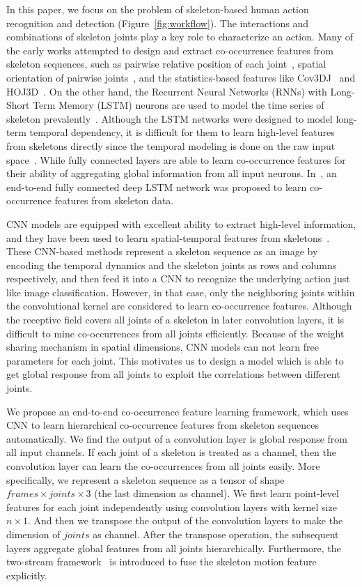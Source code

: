 \documentclass{article}
\begin{document}
In this paper, we focus on the problem of skeleton-based human action recognition and detection (Figure~\ref{fig:workflow}). The interactions and combinations of skeleton joints play a key role to characterize an action. Many of the early works attempted to design and extract co-occurrence features from skeleton sequences, such as pairwise relative position of each joint~\cite{Wang2014Learning}, spatial orientation of pairwise joints~\cite{Jin2012Essential}, and the statistics-based features like Cov3DJ~\cite{Hussein2013Human} and HOJ3D~\cite{hog3D}. On the other hand, the Recurrent Neural Networks (RNNs) with Long-Short Term Memory (LSTM) neurons are used to model the time series of skeleton prevalently~\cite{NTURGBD,song2016end,trust_gate}. Although the LSTM networks were designed to model long-term temporal dependency, it is difficult for them to learn high-level features from skeletons directly since the temporal modeling is done on the raw input space~\cite{Sainath2015}. While fully connected layers are able to learn co-occurrence features for their ability of aggregating global information from all input neurons. In~\cite{co_occurrence}, an end-to-end fully connected deep LSTM network was proposed to learn co-occurrence features from skeleton data.

CNN models are equipped with excellent ability to extract high-level information, and they have been used to learn spatial-temporal features from skeletons~\cite{Du2016Skeleton,Ke_2017_CVPR}. These CNN-based methods represent a skeleton sequence as an image by encoding the temporal dynamics and the skeleton joints as rows and columns respectively, and then feed it into a CNN to recognize the underlying action just like image classification. However, in that case, only the neighboring joints within the convolutional kernel are considered to learn co-occurrence features. Although the receptive field covers all joints of a skeleton in later convolution layers, it is difficult to mine co-occurrences from all joints efficiently. Because of the weight sharing mechanism in spatial dimensions, CNN models can not learn free parameters for each joint.
This motivates us to design a model which is able to get global response from all joints to exploit the correlations between different joints.

We propose an end-to-end co-occurrence feature learning framework, which uses CNN to learn hierarchical co-occurrence features from skeleton sequences automatically. We find the output of a convolution layer is global response from all input channels. If each joint of a skeleton is treated as a channel, then the convolution layer can learn the co-occurrences from all joints easily.  More specifically, we represent a skeleton sequence as a tensor of shape $frames\times joints\times 3$ (the last dimension as channel). We first learn point-level features for each joint independently using convolution layers with kernel size $n\times 1$. And then we transpose the output of the convolution layers to make the dimension of $joints$ as channel. After the transpose operation, the subsequent layers aggregate global features from all joints hierarchically. Furthermore, the two-stream framework~\cite{NIPS2014_5353} is introduced to fuse the skeleton motion feature explicitly.
\end{document}
